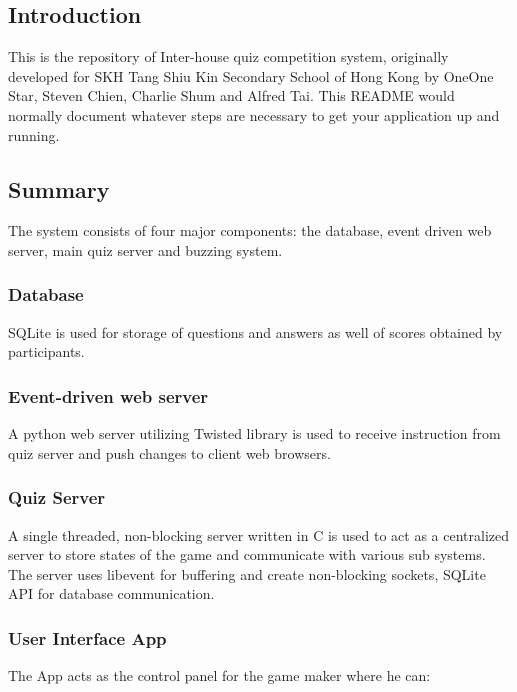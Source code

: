 \subsection*{Introduction}

This is the repository of Inter-\/house quiz competition system, originally developed for S\+K\+H Tang Shiu Kin Secondary School of Hong Kong by One\+One Star, Steven Chien, Charlie Shum and Alfred Tai. This R\+E\+A\+D\+M\+E would normally document whatever steps are necessary to get your application up and running.

\subsection*{Summary}

The system consists of four major components\+: the database, event driven web server, main quiz server and buzzing system.

\subsubsection*{Database}

S\+Q\+Lite is used for storage of questions and answers as well of scores obtained by participants.

\subsubsection*{Event-\/driven web server}

A python web server utilizing Twisted library is used to receive instruction from quiz server and push changes to client web browsers.

\subsubsection*{Quiz Server}

A single threaded, non-\/blocking server written in C is used to act as a centralized server to store states of the game and communicate with various sub systems. The server uses libevent for buffering and create non-\/blocking sockets, S\+Q\+Lite A\+P\+I for database communication.

\subsubsection*{User Interface App}

The App acts as the control panel for the game maker where he can\+:


